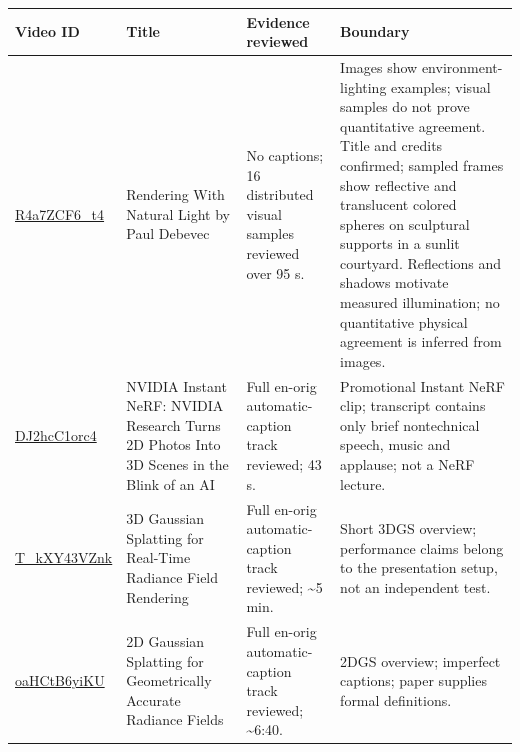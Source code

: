 {\def\LTcaptype{none} %
\begin{longtable}[]{@{}
  >{\raggedright\arraybackslash}p{}
  >{\raggedright\arraybackslash}p{}
  >{\raggedright\arraybackslash}p{}
  >{\raggedright\arraybackslash}p{}@{}}
\toprule\noalign{}
\begin{minipage}[b]{\linewidth}\raggedright
Video ID
\end{minipage} & \begin{minipage}[b]{\linewidth}\raggedright
Title
\end{minipage} & \begin{minipage}[b]{\linewidth}\raggedright
Evidence reviewed
\end{minipage} & \begin{minipage}[b]{\linewidth}\raggedright
Boundary
\end{minipage} \\
\midrule\noalign{}
\endhead
\bottomrule\noalign{}
\endlastfoot
\href{https://www.youtube.com/watch?v=R4a7ZCF6_t4}{R4a7ZCF6\_t4} & 1998 Rendering With Natural Light by Paul Debevec & No captions; 16 distributed visual samples reviewed over 95 s. & Images show environment-lighting examples; visual samples do not prove quantitative agreement. Title and credits confirmed; sampled frames show reflective and translucent colored spheres on sculptural supports in a sunlit courtyard. Reflections and shadows motivate measured illumination; no quantitative physical agreement is inferred from images. \\
\href{https://www.youtube.com/watch?v=DJ2hcC1orc4}{DJ2hcC1orc4} & NVIDIA Instant NeRF: NVIDIA Research Turns 2D Photos Into 3D Scenes in the Blink of an AI & Full en-orig automatic-caption track reviewed; 43 s. & Promotional Instant NeRF clip; transcript contains only brief nontechnical speech, music and applause; not a NeRF lecture. \\
\href{https://www.youtube.com/watch?v=T_kXY43VZnk}{T\_kXY43VZnk} & 3D Gaussian Splatting for Real-Time Radiance Field Rendering & Full en-orig automatic-caption track reviewed; \textasciitilde5 min. & Short 3DGS overview; performance claims belong to the presentation setup, not an independent test. \\
\href{https://www.youtube.com/watch?v=oaHCtB6yiKU}{oaHCtB6yiKU} & 2D Gaussian Splatting for Geometrically Accurate Radiance Fields & Full en-orig automatic-caption track reviewed; \textasciitilde6:40. & 2DGS overview; imperfect captions; paper supplies formal definitions. \\

\end{longtable}}
